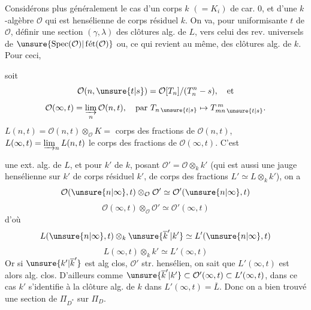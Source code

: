 


Considérons plus généralement le cas d'un corps $k$ $(=K_i)$ de car. $0$, et d'une  $k$-algèbre $\mathcal{O}$ qui est  hensélienne de corps résiduel $k$.
On va, pour  uniformisante $t$ de $\mathcal{O}$, définir une section $(\gamma,\lambda)$     des clôtures alg. de $L$, vers celui des rev. universels de $\unsure{\operatorname{Spec}(\mathcal{O})|\operatorname{f\acute{e}t}(\mathcal{O})}$ ou, ce qui revient au même, des clôtures alg. de $k$. Pour ceci,

soit
\[
\mathcal{O}(n,\unsure{t|s})=\mathcal{O}[T_n]/(T_n^n-s),\quad\text{et}
\]
\[
\mathcal{O}(\infty,t)=\varinjlim_n\mathcal{O}(n,t),\quad
\text{par }T_{n\,\unsure{t|s}}\mapsto T_{mn\,\unsure{t|s}}^{\,m}.
\]
$L(n,t)=\mathcal{O}(n,t)\otimes_{\mathcal{O}}K=$ corps des fractions de $\mathcal{O}(n,t)$, $L(\infty,t)=\varinjlim_n L(n,t)$ le corps des fractions de $\mathcal{O}(\infty,t)$. C'est



une ext. alg. de $L$, et pour    $k'$ de $k$, posant $\mathcal{O}'=\mathcal{O}\otimes_k k'$ (qui est aussi une jauge hensélienne sur $k'$ de corps résiduel $k'$, de corps des fractions $L'\simeq L\otimes_k k'$), on a  
\[
\mathcal{O}(\unsure{n|\infty},t)\otimes_{\mathcal{O}}\mathcal{O}'\simeq\mathcal{O}'(\unsure{n|\infty},t)
\]
\[
\mathcal{O}(\infty,t)\otimes_{\mathcal{O}}\mathcal{O}'\simeq\mathcal{O}'(\infty,t)
\]
d'où
\[
L(\unsure{n|\infty},t)\otimes_k\unsure{\overline{k}'|k'}\simeq L'(\unsure{n|\infty},t)
\]
\[
L(\infty,t)\otimes_k k'\simeq L'(\infty,t)
\]
Or si $\unsure{k'|\overline{k}'}$ est alg clos,  $\mathcal{O}'$ str. hensélien, on sait que $L'(\infty,t)$ est alors alg. clos.
D'ailleurs  comme $\unsure{\overline{k}'|k'}\subset\mathcal{O}'(\infty,t)\subset L'(\infty,t)$, dans ce cas  $k'$  s'identifie à la clôture alg.  de $k$ dans $L'(\infty,t)=\overline{L}$.
Donc on a bien trouvé une section de $\Pi_{D^*}$ sur $\Pi_D$.

